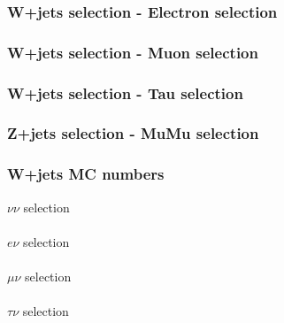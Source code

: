 \documentclass[red,compress,xcolor=table]{beamer}
\begin{document}
\begin{frame}
  \frametitle{W+jets selection -  Electron selection}

\vspace*{-1cm}
\begin{center}
{\tiny
\hspace*{-1cm}

}
\end{center}


\end{frame}

\begin{frame}
  \frametitle{W+jets selection -  Muon selection}

\vspace*{-1cm}
\begin{center}
{\tiny
\hspace*{-1cm}

}
\end{center}


\end{frame}

\begin{frame}
  \frametitle{W+jets selection -  Tau selection}

\vspace*{-1cm}
\begin{center}
{\tiny
\hspace*{-1cm}

}
\end{center}

\end{frame}

\begin{frame}
  \frametitle{Z+jets selection -  MuMu selection}

\vspace*{-1cm}
\begin{center}
{\tiny
\hspace*{-1cm}

}
\end{center}

\end{frame}


\begin{frame}
  \frametitle{W+jets MC numbers}
\vspace*{-0.5cm}
{\tiny
\centering $\nu\nu$ selection\\
\hspace*{-1cm}
\\
\centering $e\nu$ selection\\
\hspace*{-1cm}
\\
\centering $\mu\nu$ selection\\
\hspace*{-1cm}
\\
\centering $\tau\nu$ selection\\
\hspace*{-1cm}

}
\end{frame}
\end{document}
